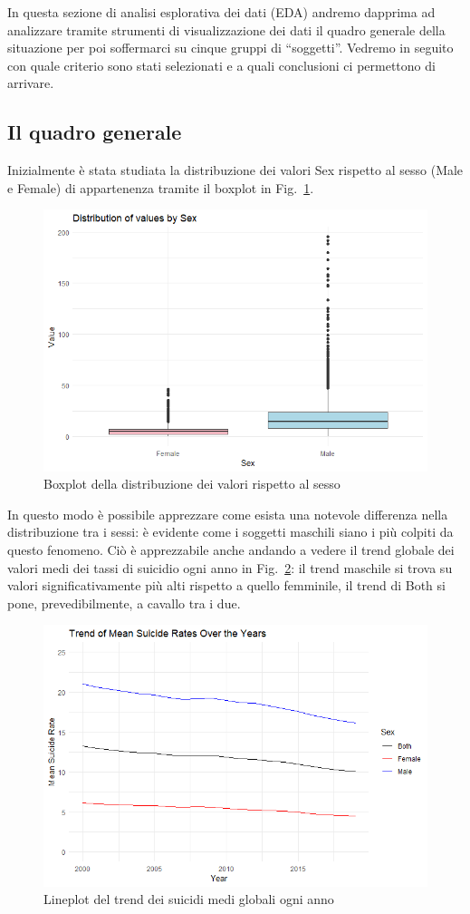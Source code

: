 \documentclass[conference]{IEEEtran}
\begin{document}
In questa sezione di analisi esplorativa dei dati (EDA) andremo dapprima
ad analizzare tramite strumenti di visualizzazione dei dati il quadro generale
della situazione per poi soffermarci su cinque gruppi di ``soggetti''.
Vedremo in seguito con quale criterio sono stati selezionati e a quali
conclusioni ci permettono di arrivare.

\subsection{Il quadro generale}

Inizialmente è stata studiata la distribuzione dei valori Sex rispetto
al sesso (Male e Female) di appartenenza tramite il boxplot in Fig.~\ref{1sex}.
\begin{figure}[htbp]
    \centerline{\includegraphics[width=.5\textwidth]{img/1 - Sex.png}}
    \caption{Boxplot della distribuzione dei valori rispetto al sesso}
    \label{1sex}
\end{figure}
In questo modo è possibile apprezzare come esista una notevole differenza
nella distribuzione tra i sessi: è evidente come i soggetti maschili siano
i più colpiti da questo fenomeno.
Ciò è apprezzabile anche andando a vedere il trend globale dei valori medi
dei tassi di suicidio ogni anno in Fig.~\ref{2globtrend}: il trend maschile
si trova su valori significativamente più alti rispetto a quello femminile,
il trend di Both si pone, prevedibilmente, a cavallo tra i due.
\begin{figure}[htbp]
    \centerline{\includegraphics[width=.5\textwidth]{img/2 - Globtrend.png}}
    \caption{Lineplot del trend dei suicidi medi globali ogni anno}
    \label{2globtrend}
\end{figure}
\end{document}
